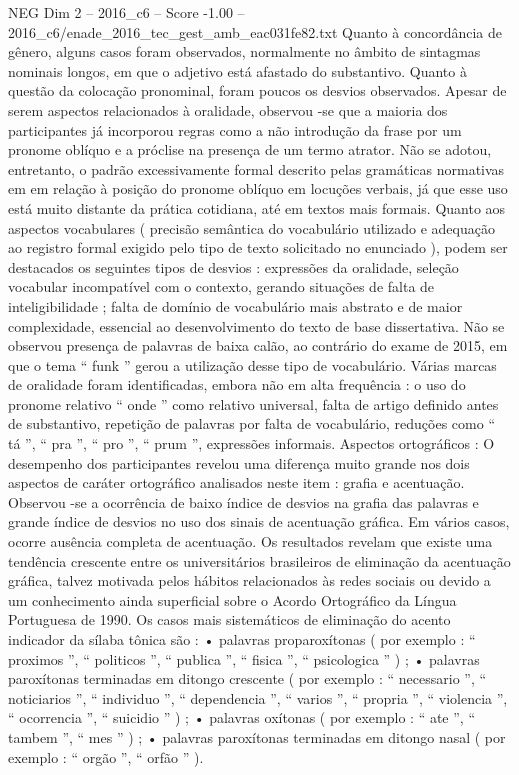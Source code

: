 \begin{textsample}{NEG Dim 2 – 2016\_c6 – Score -1.00 – 2016\_c6/enade\_2016\_tec\_gest\_amb\_eac031fe82.txt}
Quanto à concordância de gênero, alguns casos foram observados, normalmente no âmbito de sintagmas nominais longos, em que o adjetivo está afastado do substantivo.
Quanto à questão da colocação pronominal, foram poucos os desvios observados.
Apesar de serem aspectos relacionados à oralidade, observou -se que a maioria dos participantes já incorporou regras como a não introdução da frase por um pronome oblíquo e a próclise na presença de um termo atrator.
Não se adotou, entretanto, o padrão excessivamente formal descrito pelas gramáticas normativas em em relação à posição do pronome oblíquo em locuções verbais, já que esse uso está muito distante da prática cotidiana, até em textos mais formais.
Quanto aos aspectos vocabulares ( precisão semântica do vocabulário utilizado e adequação ao registro formal exigido pelo tipo de texto solicitado no enunciado ), podem ser destacados os seguintes tipos de desvios : expressões da oralidade, seleção vocabular incompatível com o contexto, gerando situações de falta de inteligibilidade ; falta de domínio de vocabulário mais abstrato e de maior complexidade, essencial ao desenvolvimento do texto de base dissertativa.
Não se observou presença de palavras de baixa calão, ao contrário do exame de 2015, em que o tema “ funk ” gerou a utilização desse tipo de vocabulário.
Várias marcas de oralidade foram identificadas, embora não em alta frequência : o uso do pronome relativo “ onde ” como relativo universal, falta de artigo definido antes de substantivo, repetição de palavras por falta de vocabulário, reduções como “ tá ”, “ pra ”, “ pro ”, “ prum ”, expressões informais.
Aspectos ortográficos : O desempenho dos participantes revelou uma diferença muito grande nos dois aspectos de caráter ortográfico analisados neste item : grafia e acentuação.
Observou -se a ocorrência de baixo índice de desvios na grafia das palavras e grande índice de desvios no uso dos sinais de acentuação gráfica.
Em vários casos, ocorre ausência completa de acentuação.
Os resultados revelam que existe uma tendência crescente entre os universitários brasileiros de eliminação da acentuação gráfica, talvez motivada pelos hábitos relacionados às redes sociais ou devido a um conhecimento ainda superficial sobre o Acordo Ortográfico da Língua Portuguesa de 1990.
Os casos mais sistemáticos de eliminação do acento indicador da sílaba tônica são : • palavras proparoxítonas ( por exemplo : “ proximos ”, “ politicos ”, “ publica ”, “ fisica ”, “ psicologica ” ) ; • palavras paroxítonas terminadas em ditongo crescente ( por exemplo : “ necessario ”, “ noticiarios ”, “ individuo ”, “ dependencia ”, “ varios ”, “ propria ”, “ violencia ”, “ ocorrencia ”, “ suicidio ” ) ; • palavras oxítonas ( por exemplo : “ ate ”, “ tambem ”, “ mes ” ) ; • palavras paroxítonas terminadas em ditongo nasal ( por exemplo : “ orgão ”, “ orfão ” ).

\end{textsample}
